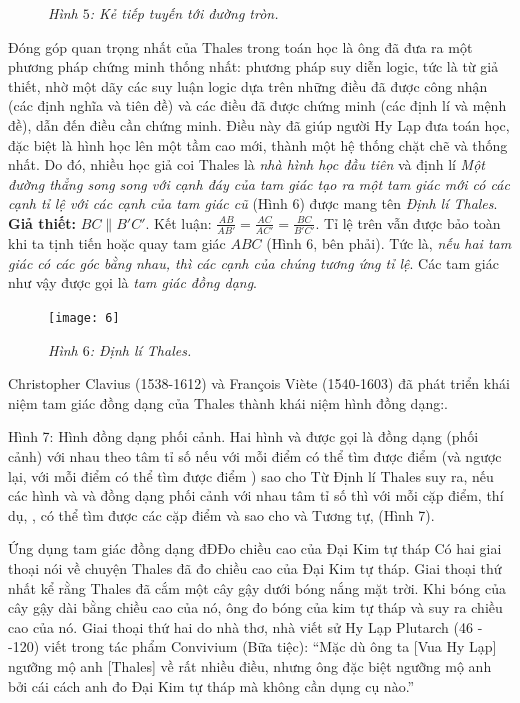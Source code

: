 \begin{multicols}{2}
{\begin{figure}[H]
		\caption{\small\textit{\color{lichsutoanhoc}Hình $5$: Kẻ tiếp tuyến tới đường tròn.}}
		\vspace*{-10pt}
	\end{figure}
	Đóng góp quan trọng nhất của Thales trong toán học là ông đã đưa ra một phương pháp chứng minh thống nhất: phương pháp suy diễn logic, tức là từ giả thiết, nhờ một dãy các suy luận logic dựa trên những điều đã được công nhận (các định nghĩa và tiên đề) và các điều đã được chứng minh (các định lí và mệnh đề), dẫn đến điều cần chứng minh. Điều này đã giúp người Hy Lạp đưa toán học, đặc biệt là hình học lên một tầm cao mới, thành một hệ thống chặt chẽ và thống nhất. Do đó, nhiều học giả coi Thales là \textit{nhà hình học đầu tiên} và định lí \textit{Một đường thẳng song song với cạnh đáy của tam giác tạo ra một tam giác mới có các cạnh tỉ lệ với các cạnh của tam giác cũ} (Hình $6$) được mang tên \textit{Định lí Thales}.
	\vskip 0.1cm
	\textbf{Giả thiết:} $BC \parallel B'C'$.
	\vskip 0.1cm    
	Kết luận: $\frac{AB}{AB'} = \frac{AC}{AC'} = \frac{BC}{B'C'}$.
	\vskip 0.1cm
	Tỉ lệ trên vẫn được bảo toàn khi ta tịnh tiến hoặc quay tam giác $ABC$ (Hình $6$, bên phải). Tức là, \textit{nếu hai tam giác có các góc bằng nhau, thì các cạnh của chúng tương ứng tỉ lệ}. Các tam giác như vậy được gọi là \textit{tam giác đồng dạng}.
	\begin{figure}[H]
		\centering
		\vspace*{-5pt}
		\captionsetup{labelformat= empty, justification=centering}
		\texttt{[image: 6]}
		\caption{\small\textit{\color{lichsutoanhoc}Hình $6$: Định lí Thales.}}
		\vspace*{-10pt}
	\end{figure}
	Christopher Clavius (1538-1612) và  François Viète (1540-1603) đã phát triển khái niệm tam giác đồng dạng của Thales thành khái niệm hình đồng dạng:. 
	
	Hình 7: Hình đồng dạng phối cảnh.
	Hai hình   và   được gọi là đồng dạng (phối cảnh) với nhau theo tâm     tỉ số   nếu với mỗi điểm    có thể tìm được điểm   (và ngược lại, với mỗi điểm    có thể tìm được điểm  ) sao cho  
	Từ Định lí Thales suy ra, nếu các hình   và   và   đồng dạng phối cảnh với nhau tâm   tỉ số   thì với mỗi cặp điểm, thí dụ,  , có thể tìm được các cặp điểm   và  sao cho  
	và  
	Tương tự,    (Hình 7).
	
	Ứng dụng tam giác đồng dạng 
	đĐĐo chiều cao của Đại Kim tự tháp 
	Có hai giai thoại nói về chuyện Thales đã đo chiều cao của Đại Kim tự tháp. Giai thoại thứ nhất kể rằng Thales đã cắm một cây gậy dưới bóng nắng mặt trời. Khi bóng của cây gậy dài bằng chiều cao của nó, ông đo bóng của kim tự tháp và suy ra chiều cao của nó. Giai thoại thứ hai do nhà thơ, nhà viết sử Hy Lạp Plutarch  (46 - -120) viết trong tác phẩm Convivium (Bữa tiệc): “Mặc dù ông ta [Vua Hy Lạp] ngưỡng mộ anh [Thales] về rất nhiều điều, nhưng ông đặc biệt ngưỡng mộ anh bởi cái cách anh đo Đại Kim tự tháp mà không cần dụng cụ nào.”
	
}
\end{multicols}
